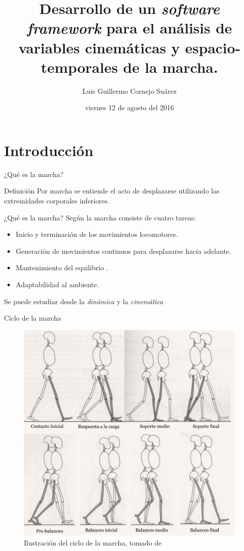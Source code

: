 \documentclass{beamer} %
\author{Luis Guillermo Cornejo Suárez}
\institute[UCR]{Universidad de Costa Rica}
\title[PRIS-Lab Motion analysis Software]{Desarrollo de un \emph{software framework} para el análisis de variables cinemáticas y espacio-temporales de la marcha.}
\date{viernes 12 de agosto del 2016}
\begin{document}
\begin{frame}
    \titlepage
\end{frame}

\section{Introducción}

\begin{frame}{¿Qué es la marcha?}
   \begin{block}{Definición}
   Por marcha se entiende el acto de desplazarse utilizando las extremidades corporales inferiores. 
   \end{block}
\end{frame}

\begin{frame}{¿Qué es la marcha?}
    Según \citep{menz} la marcha consiste de cuatro tareas:
    \begin{itemize}
        \item Inicio y terminación de los movimientos locomotores.
        \item Generación de movimientos continuos para desplazarse hacia adelante.
        \item Mantenimiento del equilibrio .
        \item Adaptabilidad al ambiente. 
    \end{itemize}
    Se puede estudiar desde la \emph{dinámica} y la \emph{cinemática}
\end{frame}

\begin{frame}{Ciclo de la marcha}
    \begin{figure}
        \centering
        \includegraphics[height=0.7\textheight]{../report/imagenes/ciclo_marcha}
        \caption{Ilustración del ciclo de la marcha, tomado de \citep{perry}}
    \end{figure}
\end{frame}
\end{document}
